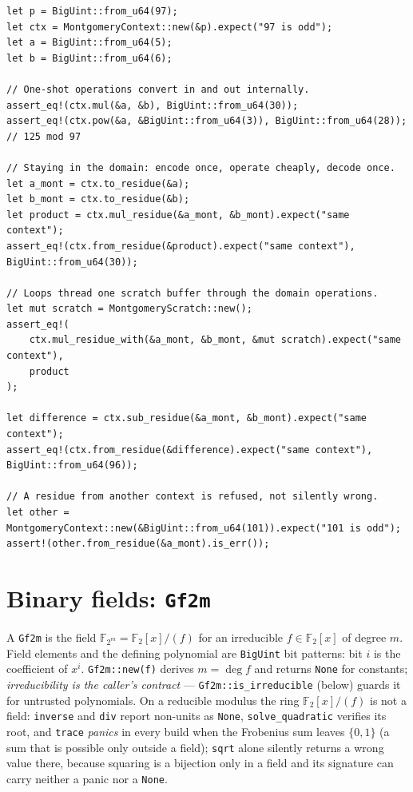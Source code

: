 \documentclass[11pt]{article}
\newcommand{\code}[1]{\texttt{#1}}
\newcommand{\F}{\mathbb{F}}
\begin{document}
\begin{lstlisting}
let p = BigUint::from_u64(97);
let ctx = MontgomeryContext::new(&p).expect("97 is odd");
let a = BigUint::from_u64(5);
let b = BigUint::from_u64(6);

// One-shot operations convert in and out internally.
assert_eq!(ctx.mul(&a, &b), BigUint::from_u64(30));
assert_eq!(ctx.pow(&a, &BigUint::from_u64(3)), BigUint::from_u64(28)); // 125 mod 97

// Staying in the domain: encode once, operate cheaply, decode once.
let a_mont = ctx.to_residue(&a);
let b_mont = ctx.to_residue(&b);
let product = ctx.mul_residue(&a_mont, &b_mont).expect("same context");
assert_eq!(ctx.from_residue(&product).expect("same context"), BigUint::from_u64(30));

// Loops thread one scratch buffer through the domain operations.
let mut scratch = MontgomeryScratch::new();
assert_eq!(
    ctx.mul_residue_with(&a_mont, &b_mont, &mut scratch).expect("same context"),
    product
);

let difference = ctx.sub_residue(&a_mont, &b_mont).expect("same context");
assert_eq!(ctx.from_residue(&difference).expect("same context"), BigUint::from_u64(96));

// A residue from another context is refused, not silently wrong.
let other = MontgomeryContext::new(&BigUint::from_u64(101)).expect("101 is odd");
assert!(other.from_residue(&a_mont).is_err());
\end{lstlisting}

\section{Binary fields: \code{Gf2m}}
\label{sec:gf2m}

A \code{Gf2m} is the field $\F_{2^m} = \F_2[x]/(f)$ for an irreducible
$f \in \F_2[x]$ of degree $m$. Field elements and the defining polynomial
are \code{BigUint} bit patterns: bit $i$ is the coefficient of $x^i$.
\code{Gf2m::new(f)} derives $m = \deg f$ and returns \code{None} for
constants; \emph{irreducibility is the caller's contract} ---
\code{Gf2m::is\_irreducible} (below) guards it for untrusted polynomials.
On a reducible modulus the ring $\F_2[x]/(f)$ is not a field: \code{inverse}
and \code{div} report non-units as \code{None}, \code{solve\_quadratic}
verifies its root, and \code{trace} \emph{panics} in every build when the
Frobenius sum leaves $\{0, 1\}$ (a sum that is possible only outside a
field); \code{sqrt} alone silently returns a wrong value there, because
squaring is a bijection only in a field and its signature can carry
neither a panic nor a \code{None}.
\end{document}
